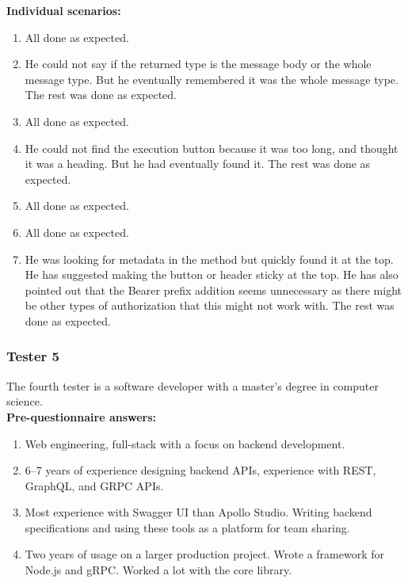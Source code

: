 \textbf{Individual scenarios:}
\begin{enumerate}
    \item All done as expected.
    \item He could not say if the returned type is the message body or the whole message type.
    But he eventually remembered it was the whole message type.
    The rest was done as expected.
    \item All done as expected.
    \item He could not find the execution button because it was too long, and thought it was a heading.
    But he had eventually found it.
    The rest was done as expected.
    \item All done as expected.
    \item All done as expected.
    \item He was looking for metadata in the method but quickly found it at the top.
    He has suggested making the button or header sticky at the top.
    He has also pointed out that the Bearer prefix addition seems unnecessary as there might be other types of authorization that this might not work with.
    The rest was done as expected.
\end{enumerate}

\subsubsection{Tester 5}
The fourth tester is a software developer with a master's degree in computer science.\\

\textbf{Pre-questionnaire answers:}
\begin{enumerate}
    \item Web engineering, full-stack with a focus on backend development.
    \item 6--7 years of experience designing backend APIs, experience with REST, GraphQL, and GRPC APIs.
    \item Most experience with Swagger UI than Apollo Studio.
    Writing backend specifications and using these tools as a platform for team sharing.
    \item Two years of usage on a larger production project.
    Wrote a framework for Node.js and gRPC\@.
    Worked a lot with the core library.
\end{enumerate}

